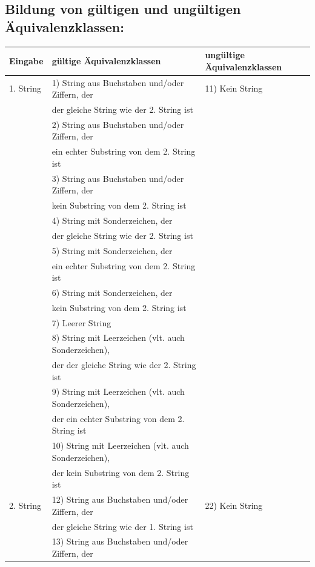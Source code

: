\documentclass[a4paper]{report}
\begin{document}
\subsection*{Bildung von gültigen und ungültigen Äquivalenzklassen:}
\begin{tabular}{l|l|l}
    Eingabe 	& gültige Äquivalenzklassen 							& ungültige Äquivalenzklassen\\
    \hline
    1. String 	& 1) String aus Buchstaben und/oder Ziffern, der		& 11) Kein String\\
    			&    der gleiche String wie der 2. String ist 			& \\
    			& 2) String aus Buchstaben und/oder Ziffern, der		& \\
    			&    ein echter Substring von dem 2. String ist 		& \\
    			& 3) String aus Buchstaben und/oder Ziffern, der		& \\
    			&    kein Substring von dem 2. String ist				& \\
    			& 4) String mit Sonderzeichen, der						& \\
    			&    der gleiche String wie der 2. String ist 			& \\
    			& 5) String mit Sonderzeichen, der	 					& \\
    			&    ein echter Substring von dem 2. String ist 		& \\
    			& 6) String mit Sonderzeichen, der	 					& \\
    			&    kein Substring von dem 2. String ist				& \\
    			& 7) Leerer String										& \\
    			& 8) String mit Leerzeichen (vlt. auch Sonderzeichen),	& \\
    			&    der der gleiche String wie der 2. String ist 		& \\
    			& 9) String mit Leerzeichen (vlt. auch Sonderzeichen),	& \\
    			&    der ein echter Substring von dem 2. String ist 	& \\
    			& 10) String mit Leerzeichen (vlt. auch Sonderzeichen),& \\
    			&    der kein Substring von dem 2. String ist			& \\
    \hline
    2. String 	& 12) String aus Buchstaben und/oder Ziffern, der		& 22) Kein String\\
    			&    der gleiche String wie der 1. String ist 			& \\
    			& 13) String aus Buchstaben und/oder Ziffern, der		& \\

\end{tabular}
\end{document}
